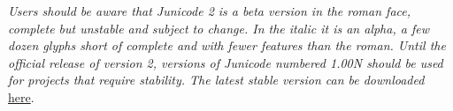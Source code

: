{\textit{Users should be aware that Junicode 2 is a beta version in the roman face,
complete but unstable and subject to change. In the italic it is an alpha, a few
dozen glyphs short of complete and with fewer features than the roman.
Until the official release of version 2, versions of Junicode
numbered \textsc{1.00N} should be used for projects that require
stability. The latest stable version can be downloaded} \href{https://github.com/psb1558/Junicode-font/releases}{here}.

}
\pagestyle{fancy}
